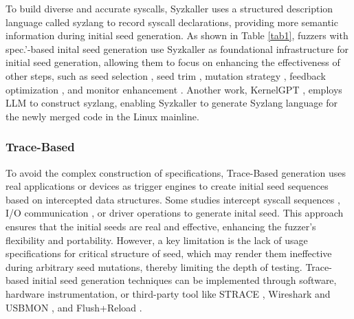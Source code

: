 To build diverse and accurate syscalls, Syzkaller \cite{Syzkaller} uses a structured description language called syzlang \cite{syzlang} to record syscall declarations, providing more semantic information during initial seed generation. As shown in Table \ref{tab1}, fuzzers with spec.'-based inital seed generation use Syzkaller as foundational infrastructure for initial seed generation, allowing them to focus on enhancing the effectiveness of other steps, such as seed selection \cite{wang2021syzvegas,Yuan2023DDRace}, seed trim \cite{shen2021rtkaller,zhao2022semantic,hao2023syzdescribe}, mutation strategy \cite{xu2020krace,sun2021healer,shen2021rtkaller,zhao2022semantic}, feedback optimization \cite{JANUS2019fuzzing,shi2019industry,xu2020krace,shen2021rtkaller,wang2021syzvegas,zhao2022statefuzz,CONZZER2022context,zhao2022semantic,jeong2023segfuzz}, and monitor enhancement \cite{jeong2019razzer,xu2020krace,CONZZER2022context,jeong2023segfuzz}.  Another work, KernelGPT \cite{yang2023kernelgpt}, employs LLM to construct syzlang, enabling Syzkaller to generate Syzlang language for the newly merged code in the Linux mainline.


\subsubsection{Trace-Based}
To avoid the complex construction of specifications, Trace-Based generation uses real applications or devices as trigger engines to create initial seed sequences based on intercepted data structures. Some studies intercept syscall sequences \cite{pailoor2018moonshine,schwarz2018automated,liang2020xafl,fleischer2023actor,Jang2023ReUSB}, I/O communication \cite{song2020agamotto,Pustogarov2020ExvivoDA,pan2021V-shuttle,myung2022mundofuzz,bulekov2022morphuzz,shen2022drifuzz,Liu2023VDGuard,Song2019PeriScopeAE,Liu2023ViDeZZoDV,Huster2024ToBoldly}, or driver operations \cite{henderson2017vdf,cesarano2023iris,Jang2023ReUSB} to generate inital seed. This approach ensures that the initial seeds are real and effective, enhancing the fuzzer's flexibility and portability. However, a key limitation is the lack of usage specifications for critical structure of seed, which may render them ineffective during arbitrary seed mutations, thereby limiting the depth of testing. Trace-based initial seed generation techniques can be implemented through software, hardware instrumentation, or third-party tool like STRACE \cite{Strace}, Wireshark \cite{Wireshark} and USBMON \cite{usbmon}, and Flush+Reload \cite{Yarom2014FLUSHRELOADAH, 2011IS}.

